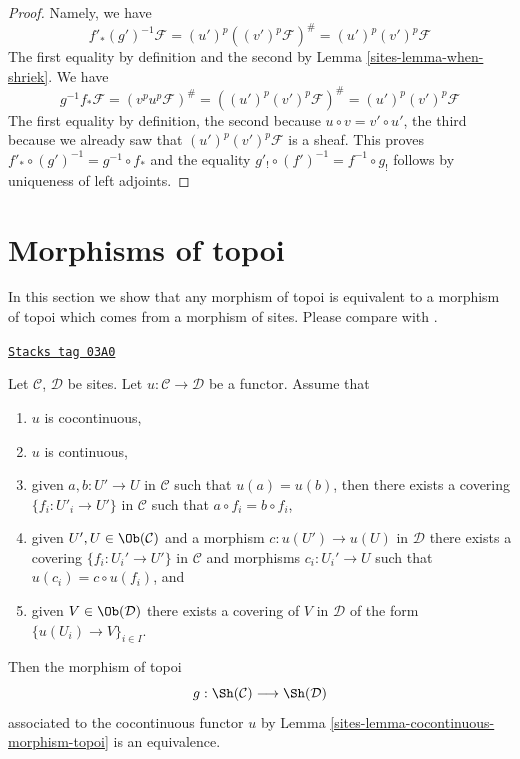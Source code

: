 \begin{proof}

Namely, we have
$$
f'_*(g')^{-1}\mathcal{F} = (u')^p((v')^p\mathcal{F})^\# =
(u')^p(v')^p\mathcal{F}
$$
The first equality by definition and the
second by Lemma \ref{sites-lemma-when-shriek}. We have
$$
g^{-1}f_*\mathcal{F} = (v^pu^p\mathcal{F})^\# =
((u')^p(v')^p\mathcal{F})^\# = (u')^p(v')^p\mathcal{F}
$$
The first equality by definition, the second because
$u \circ v = v' \circ u'$, the third because we already saw that
$(u')^p(v')^p\mathcal{F}$ is a sheaf. This proves
$f'_* \circ (g')^{-1} = g^{-1} \circ f_*$ and the equality
$g'_! \circ (f')^{-1} = f^{-1} \circ g_!$ follows by
uniqueness of left adjoints.
\end{proof}

\section{Morphisms of topoi}
\label{sites-section-morphisms-topoi}
In this section we show that any morphism of topoi is equivalent
to a morphism of topoi which comes from a morphism of sites.
Please compare with \cite[Expos\'e III, Proposition 4.9.4]{SGA4}.

\begin{lemma}[Equivalence]
\label{sites-lemma-equivalence}
\href{https://stacks.math.columbia.edu/tag/03A0}{\texttt{Stacks tag 03A0}}

Let $\mathcal{C}$, $\mathcal{D}$ be sites.
Let $u : \mathcal{C} \to \mathcal{D}$ be a functor.
Assume that
\begin{enumerate}
\item $u$ is cocontinuous,
\item $u$ is continuous,
\item given $a, b : U' \to U$ in $\mathcal{C}$ such that
$u(a) = u(b)$, then there exists a covering $\{f_i : U'_i \to U'\}$
in $\mathcal{C}$ such that $a \circ f_i = b \circ f_i$,
\item given $U', U \in \Ob(\mathcal{C})$ and
a morphism $c : u(U') \to u(U)$ in $\mathcal{D}$ there exists
a covering $\{f_i : U_i' \to U'\}$ in $\mathcal{C}$
and morphisms $c_i : U_i' \to U$ such that $u(c_i) = c \circ u(f_i)$, and
\item given $V \in \Ob(\mathcal{D})$ there exists a covering
of $V$ in $\mathcal{D}$ of the form $\{u(U_i) \to V\}_{i \in I}$.
\end{enumerate}
Then the morphism of topoi
$$
g : \Sh(\mathcal{C}) \longrightarrow \Sh(\mathcal{D})
$$
associated to the cocontinuous functor $u$ by
Lemma \ref{sites-lemma-cocontinuous-morphism-topoi}
is an equivalence.
\end{lemma}

